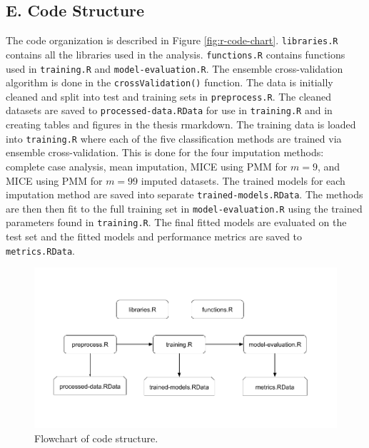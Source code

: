 \documentclass[12pt,]{article}
\begin{document}
\subsection{E. Code Structure}\label{e.-code-structure}

The code organization is described in Figure \ref{fig:r-code-chart}.
\texttt{libraries.R} contains all the libraries used in the analysis.
\texttt{functions.R} contains functions used in \texttt{training.R} and
\texttt{model-evaluation.R}. The ensemble cross-validation algorithm is
done in the \texttt{crossValidation()} function. The data is initially
cleaned and split into test and training sets in \texttt{preprocess.R}.
The cleaned datasets are saved to \texttt{processed-data.RData} for use
in \texttt{training.R} and in creating tables and figures in the thesis
rmarkdown. The training data is loaded into \texttt{training.R} where
each of the five classification methods are trained via ensemble
cross-validation. This is done for the four imputation methods: complete
case analysis, mean imputation, MICE using PMM for \(m=9\), and MICE
using PMM for \(m=99\) imputed datasets. The trained models for each
imputation method are saved into separate \texttt{trained-models.RData}.
The methods are then then fit to the full training set in
\texttt{model-evaluation.R} using the trained parameters found in
\texttt{training.R}. The final fitted models are evaluated on the test
set and the fitted models and performance metrics are saved to
\texttt{metrics.RData}.

\begin{figure}[H]

{\centering \includegraphics[width=1\linewidth]{images/r-code-chart} 

}

\caption{\label{fig:r-code-chart}Flowchart of code structure.}\label{fig:unnamed-chunk-21}
\end{figure}

\newpage


\end{document}
